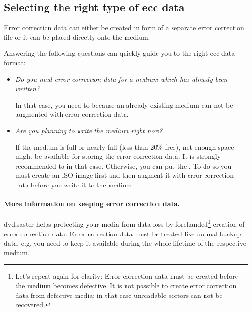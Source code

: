 \newpage
\subsection{Selecting the right type of ecc data}
\label{howto-ecc}

Error correction data can either be created in form of
a separate error correction file or it can be placed directly
onto the medium.

\smallskip

Answering the following questions can quickly guide you to the right
ecc data format:

\begin{itemize}
\item {\em Do you need error correction data for a medium which has already been written?}

  In that case, you need to  because an already existing medium can not be
  augmented with error correction data. 

\item {\em Are you planning to write the medium right now?}

  If the medium is full or nearly full (less than 20\% free),
  not enough space might be available for storing the error
  correction data. It is strongly recommended to  in that case. Otherwise, you can put
  the .
  To do so you must create an ISO image first and then augment it with
  error correction data before you write it to the medium. 
\end{itemize}

\paragraph{More information on keeping error correction data.}\quad

dvdisaster helps protecting your media from data loss by
forehanded\footnote{ Let's repeat again for clarity: Error correction data
  must be created before the medium becomes defective. It is not possible
  to create error correction data from defective media; in that case
  unreadable sectors can not be recovered.} creation of error correction
data. Error correction data must be treated like normal backup data,
e.g. you need to keep it available during the whole lifetime of the
respective medium.

\smallskip

